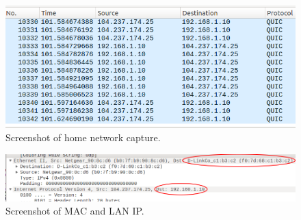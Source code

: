\documentclass{article}
\begin{document}
\begin{figure}
\begin{mdframed}
\includegraphics[scale=0.5]{Step_2e.png}
\caption{Screenshot of home network capture.}
\label{fig:step2e}
\end{mdframed}
\end{figure}

\begin{figure}
\begin{mdframed}
\includegraphics[scale=0.35]{Step_2g.png}
\caption{Screenshot of MAC and LAN IP.}
\label{fig:step2g}
\end{mdframed}
\end{figure}

\end{document}

